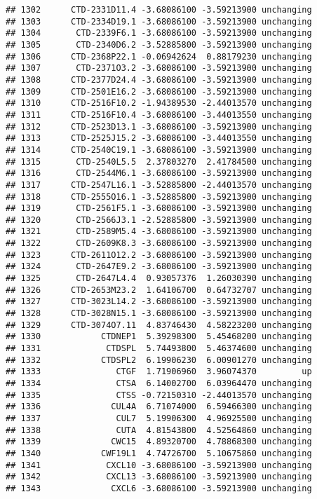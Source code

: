 \documentclass[]{article}
\begin{document}
\begin{verbatim}
## 1302      CTD-2331D11.4 -3.68086100 -3.59213900 unchanging
## 1303      CTD-2334D19.1 -3.68086100 -3.59213900 unchanging
## 1304       CTD-2339F6.1 -3.68086100 -3.59213900 unchanging
## 1305       CTD-2340D6.2 -3.52885800 -3.59213900 unchanging
## 1306      CTD-2368P22.1 -0.06942624  0.88179230 unchanging
## 1307       CTD-2371O3.2 -3.68086100 -3.59213900 unchanging
## 1308      CTD-2377D24.4 -3.68086100 -3.59213900 unchanging
## 1309      CTD-2501E16.2 -3.68086100 -3.59213900 unchanging
## 1310      CTD-2516F10.2 -1.94389530 -2.44013570 unchanging
## 1311      CTD-2516F10.4 -3.68086100 -3.44013550 unchanging
## 1312      CTD-2523D13.1 -3.68086100 -3.59213900 unchanging
## 1313      CTD-2525J15.2 -3.68086100 -3.44013550 unchanging
## 1314      CTD-2540C19.1 -3.68086100 -3.59213900 unchanging
## 1315       CTD-2540L5.5  2.37803270  2.41784500 unchanging
## 1316       CTD-2544M6.1 -3.68086100 -3.59213900 unchanging
## 1317      CTD-2547L16.1 -3.52885800 -2.44013570 unchanging
## 1318      CTD-2555O16.1 -3.52885800 -3.59213900 unchanging
## 1319       CTD-2561F5.1 -3.68086100 -3.59213900 unchanging
## 1320       CTD-2566J3.1 -2.52885800 -3.59213900 unchanging
## 1321       CTD-2589M5.4 -3.68086100 -3.59213900 unchanging
## 1322       CTD-2609K8.3 -3.68086100 -3.59213900 unchanging
## 1323      CTD-2611O12.2 -3.68086100 -3.59213900 unchanging
## 1324       CTD-2647E9.2 -3.68086100 -3.59213900 unchanging
## 1325       CTD-2647L4.4  0.93057376  1.26030390 unchanging
## 1326      CTD-2653M23.2  1.64106700  0.64732707 unchanging
## 1327      CTD-3023L14.2 -3.68086100 -3.59213900 unchanging
## 1328      CTD-3028N15.1 -3.68086100 -3.59213900 unchanging
## 1329      CTD-3074O7.11  4.83746430  4.58223200 unchanging
## 1330            CTDNEP1  5.39298300  5.45468200 unchanging
## 1331             CTDSPL  5.74493800  5.46374600 unchanging
## 1332            CTDSPL2  6.19906230  6.00901270 unchanging
## 1333               CTGF  1.71906960  3.96074370         up
## 1334               CTSA  6.14002700  6.03964470 unchanging
## 1335               CTSS -0.72150310 -2.44013570 unchanging
## 1336              CUL4A  6.71074000  6.59466300 unchanging
## 1337               CUL7  5.19906300  4.96925500 unchanging
## 1338               CUTA  4.81543800  4.52564860 unchanging
## 1339              CWC15  4.89320700  4.78868300 unchanging
## 1340            CWF19L1  4.74726700  5.10675860 unchanging
## 1341             CXCL10 -3.68086100 -3.59213900 unchanging
## 1342             CXCL13 -3.68086100 -3.59213900 unchanging
## 1343              CXCL6 -3.68086100 -3.59213900 unchanging

\end{verbatim}
\end{document}

